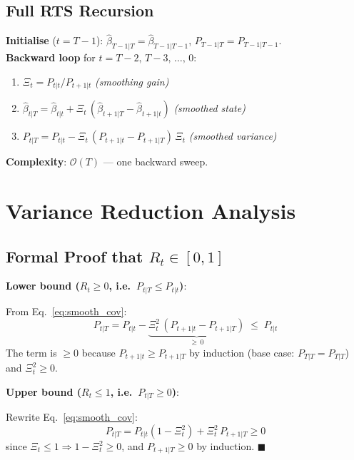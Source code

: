 \documentclass[10pt,a4paper,twocolumn]{article}
\begin{document}
\subsection{Full RTS Recursion}

\begin{tcolorbox}[resultbox={Complete RTS Algorithm}]
\textbf{Initialise} ($t = T-1$):
$\hat\beta_{T-1|T} = \hat\beta_{T-1|T-1}$,\;
$P_{T-1|T} = P_{T-1|T-1}$.\\[4pt]
\textbf{Backward loop} for $t = T-2,\,T-3,\,\ldots,\,0$:
\begin{enumerate}\setlength\itemsep{2pt}
  \item $\Xi_t = P_{t|t} / P_{t+1|t}$
        \hfill\textit{(smoothing gain)}
  \item $\hat\beta_{t|T} = \hat\beta_{t|t}
          + \Xi_t\,(\hat\beta_{t+1|T} - \hat\beta_{t+1|t})$
        \hfill\textit{(smoothed state)}
  \item $P_{t|T} = P_{t|t}
          - \Xi_t\,(P_{t+1|t} - P_{t+1|T})\,\Xi_t$
        \hfill\textit{(smoothed variance)}
\end{enumerate}
\textbf{Complexity}: $\mathcal{O}(T)$ --- one backward sweep.
\end{tcolorbox}

\section{Variance Reduction Analysis}

\subsection{Formal Proof that $R_t \in [0,1]$}

\begin{tcolorbox}[mathbox={Proof: {$R_t \in [0,1]$}}]
\textbf{Lower bound ($R_t \geq 0$, i.e.\ $P_{t|T} \leq P_{t|t}$)}:

\noindent From Eq.~\eqref{eq:smooth_cov}:
\[
  P_{t|T} = P_{t|t} - \underbrace{\Xi_t^2\,(P_{t+1|t}-P_{t+1|T})}_{\geq\,0}
  \;\leq\; P_{t|t}
\]
The term is $\geq 0$ because $P_{t+1|t} \geq P_{t+1|T}$ by induction
(base case: $P_{T|T} = P_{T|T}$) and $\Xi_t^2 \geq 0$.

\textbf{Upper bound ($R_t \leq 1$, i.e.\ $P_{t|T} \geq 0$)}:

\noindent Rewrite Eq.~\eqref{eq:smooth_cov}:
\[
  P_{t|T} = P_{t|t}(1 - \Xi_t^2) + \Xi_t^2\,P_{t+1|T} \geq 0
\]
since $\Xi_t \leq 1 \Rightarrow 1-\Xi_t^2 \geq 0$, and
$P_{t+1|T} \geq 0$ by induction. $\blacksquare$
\end{tcolorbox}
\end{document}
